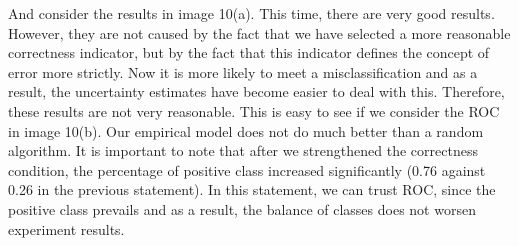 \documentclass[a4paper,14pt]{extarticle}
\begin{document}
	And consider the results in image 10(a). This time, there are very good results. However, they are not caused by the fact that we have selected a more reasonable correctness indicator, but by the fact that this indicator defines the concept of error more strictly. Now it is more likely to meet a misclassification and as a result, the uncertainty estimates have become easier to deal with this. Therefore, these results are not very reasonable. This is easy to see if we consider the ROC in image 10(b). Our empirical model does not do much better than a random algorithm. It is important to note that after we strengthened the correctness condition, the percentage of positive class increased significantly (0.76 against 0.26 in the previous statement). In this statement, we can trust ROC, since the positive class prevails and as a result, the balance of classes does not worsen experiment results.
	
\end{document}
